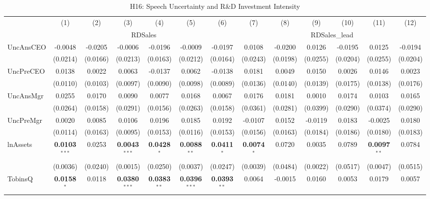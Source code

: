 \begin{landscape}
\begin{table}[H]
\setlength{\tabcolsep}{3pt}
\renewcommand{\arraystretch}{0.85}
\centering
\caption{H16: Speech Uncertainty and R\&D Investment Intensity}
\label{tab:h16}
\scriptsize
\begin{tabular}{lcccccccccccc}
\toprule
 & (1) & (2) & (3) & (4) & (5) & (6) & (7) & (8) & (9) & (10) & (11) & (12) \\
 & \multicolumn{6}{c}{RDSales} & \multicolumn{6}{c}{RDSales\_lead} \\
\cmidrule(lr){2-7} \cmidrule(lr){8-13}
\midrule
UncAnsCEO & -0.0048 & -0.0205 & -0.0006 & -0.0196 & -0.0009 & -0.0197 & 0.0108 & -0.0200 & 0.0126 & -0.0195 & 0.0125 & -0.0194 \\
 & (0.0214) & (0.0166) & (0.0213) & (0.0163) & (0.0212) & (0.0164) & (0.0243) & (0.0198) & (0.0255) & (0.0204) & (0.0255) & (0.0204) \\
UncPreCEO & 0.0138 & 0.0022 & 0.0063 & -0.0137 & 0.0062 & -0.0138 & 0.0181 & 0.0049 & 0.0150 & 0.0026 & 0.0146 & 0.0023 \\
 & (0.0110) & (0.0103) & (0.0097) & (0.0090) & (0.0098) & (0.0089) & (0.0136) & (0.0140) & (0.0139) & (0.0175) & (0.0138) & (0.0176) \\
UncAnsMgr & 0.0255 & 0.0170 & 0.0090 & 0.0077 & 0.0168 & 0.0067 & 0.0176 & 0.0181 & 0.0010 & 0.0174 & 0.0103 & 0.0165 \\
 & (0.0264) & (0.0158) & (0.0291) & (0.0156) & (0.0263) & (0.0158) & (0.0361) & (0.0281) & (0.0399) & (0.0290) & (0.0374) & (0.0290) \\
UncPreMgr & 0.0020 & 0.0085 & 0.0106 & 0.0196 & 0.0185 & 0.0192 & -0.0107 & 0.0152 & -0.0119 & 0.0183 & -0.0025 & 0.0180 \\
 & (0.0114) & (0.0163) & (0.0095) & (0.0153) & (0.0116) & (0.0153) & (0.0156) & (0.0163) & (0.0184) & (0.0186) & (0.0180) & (0.0183) \\
\midrule
lnAssets & \textbf{0.0103}$^{***}$ & 0.0253 & \textbf{0.0043}$^{***}$ & \textbf{0.0428}$^{*}$ & \textbf{0.0088}$^{**}$ & \textbf{0.0411}$^{*}$ & \textbf{0.0074}$^{*}$ & 0.0720 & 0.0035 & 0.0789 & \textbf{0.0097}$^{**}$ & 0.0784 \\
 & (0.0036) & (0.0240) & (0.0015) & (0.0250) & (0.0037) & (0.0247) & (0.0039) & (0.0484) & (0.0022) & (0.0517) & (0.0047) & (0.0515) \\
TobinsQ & \textbf{0.0158}$^{*}$ & 0.0118 & \textbf{0.0380}$^{***}$ & \textbf{0.0383}$^{**}$ & \textbf{0.0396}$^{***}$ & \textbf{0.0393}$^{**}$ & 0.0064 & -0.0015 & 0.0160 & 0.0053 & 0.0179 & 0.0057 \\

\end{tabular}
\end{table}
\end{landscape}
